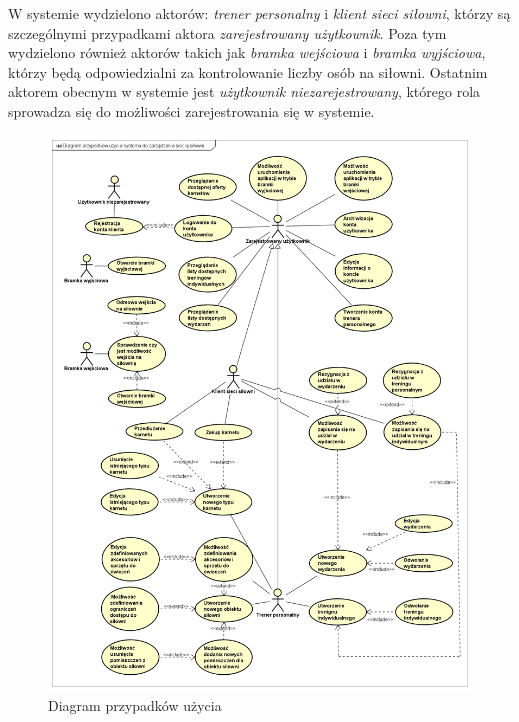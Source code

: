 \documentclass[a4paper,twoside,12pt]{book}
\begin{document}
	W systemie wydzielono aktorów: \textit{trener personalny} i \textit{klient sieci siłowni}, którzy są szczególnymi przypadkami aktora \textit{zarejestrowany użytkownik}. Poza tym wydzielono również aktorów takich jak \textit{bramka wejściowa} i \textit{bramka wyjściowa}, którzy będą odpowiedzialni za kontrolowanie liczby osób na siłowni. Ostatnim aktorem obecnym w systemie jest \textit{użytkownik niezarejestrowany}, którego rola sprowadza się do możliwości zarejestrowania się w systemie.
	
\begin{figure}[htbp]
	\includegraphics[width=1\linewidth, keepaspectratio]{diagram_przypadków_użycia_xs.png}
	\caption{Diagram przypadków użycia}
	\label{fig:diagramPrzpydakowUzyciaUML}
\end{figure}
	
\end{document}
